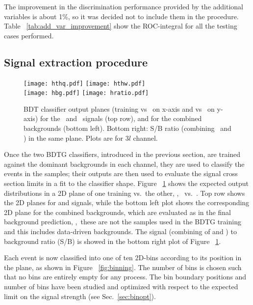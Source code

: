 The improvement in the discrimination performance provided by the additional variables is about 1\%, so it was decided not to include them in the procedure. Table ~\ref{tab:add_var_improvement} show the ROC-integral for all the testing cases performed.

\subsection{Signal extraction procedure}

\begin{figure} [!h]
 \centering
 \texttt{[image: hthq.pdf]}
 \texttt{[image: hthw.pdf]}\\
 \texttt{[image: hbg.pdf]}
 \texttt{[image: hratio.pdf]}
\caption[2D BDT classifier output planes]{BDT classifier output planes (training vs \ttbar\ on x-axis and vs \ttV\ on y-axis) for the \tHq\ and \tHW\ signals (top row), and for the combined backgrounds (bottom left). Bottom right: S/B ratio (combining \tHq\ and \tHW) in the same plane. Plots are for $3l$ channel.}
\label{fig:mva12}
\end{figure}

Once the two BDTG classifiers, introduced in the previous section, are trained against the dominant backgrounds in each channel, they are used to classify the events in the samples; their outputs are then used to evaluate the signal cross section limits in a fit to the classifier shape. Figure ~\ref{fig:mva12} shows the expected output distributions in a 2D plane of one training vs.\ the other, \ie, \ttV\ vs.\ \ttbar. Top row shows the 2D planes for \tHq and \tHW signals, while the bottom left plot shows the corresponding 2D plane for the combined backgrounds, which are evaluated as in the final background prediction, \ie,\ these are not the samples used in the BDTG training and this includes data-driven backgrounds. The signal (combining of \tHq and \tHW) to background ratio (S/B) is showed in the bottom right plot of Figure ~\ref{fig:mva12}.      

Each event is now classified into one of ten 2D-bins according to its position in the plane, as shown in Figure ~\ref{fig:binning}. The number of bins is chosen such that no bins are entirely empty for any process. The bin boundary positions and number of bins have been studied and optimized with respect to the expected limit on the signal strength (see Sec.~\ref{sec:binopt}).

